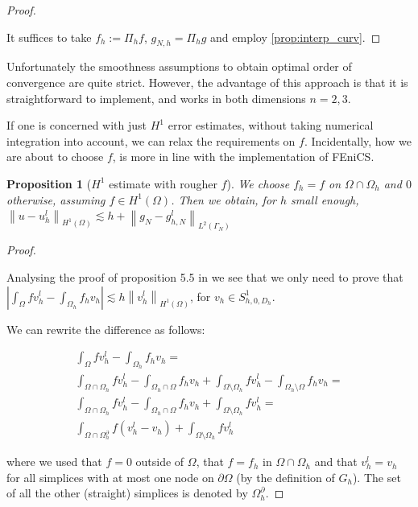 \documentclass[english,a4paper,9pt,oneside]{scrbook}	%
\theoremstyle{break}
\newtheorem{prop}[equation]{Proposition}
\newenvironment{mproof}[1][\proofname]{%
  \begin{proof}[#1]$ $\par\nobreak\ignorespaces
}{%
  \end{proof}
}
\renewcommand*{\proofname}{Proof}
\theoremstyle{remark}
\newcommand{\ds}{\displaystyle}
\newcommand{\norm}[1]{\left\lVert#1\right\rVert}
\begin{document}
\begin{appendices}
\begin{mproof}
It suffices to take $f_h:=\Pi_h f$, $g_{N,h} = \Pi_h g$ and employ \cref{prop:interp_curv}.
\end{mproof}

Unfortunately the smoothness assumptions to obtain optimal order of convergence are quite strict. However, the advantage of this approach is that it is straightforward to implement, and works in both dimensions $n=2,3$.

If one is concerned with just $H^1$ error estimates, without taking numerical integration into account, we can relax the requirements on $f$. Incidentally, how we are about to choose $f$, is more in line with the implementation of FEniCS.

\begin{prop}[$H^1$ estimate with rougher $f$]
We choose $f_h=f $ on $\Omega \cap \Omega_h$ and $0$ otherwise, assuming $f \in H^1(\Omega)$. Then we obtain, for $h$ small enough, $\norm{u-u_h^l}_{H^1(\Omega)} \lesssim h + \norm{g_N-g_{h,N}^l}_{L^2(\Gamma_N)}$
\end{prop}
\begin{mproof}

Analysing the proof of proposition 5.5 in \cite{edelmann} we see that we only need to prove that $\ds \left | \int_\Omega f v_h^l - \int_{\Omega_h}f_h v_h \right |\lesssim h \norm{v_h^l}_{H^1(\Omega)} $, for $v_h \in S^1_{h,0,D_h}$.

We can rewrite the difference as follows:

\begin{align*}
\int_\Omega f v_h^l - \int_{\Omega_h}f_h v_h   =\\
\int_{\Omega \cap \Omega_h} f v_h^l - \int_{\Omega_h \cap \Omega} f_h v_h  + \int_{\Omega \setminus \Omega_h} f v_h^l - \int_{\Omega_h \setminus \Omega} f_h v_h  =\\
\int_{\Omega \cap \Omega_h} f v_h^l - \int_{\Omega_h \cap \Omega} f_h v_h  + \int_{\Omega \setminus \Omega_h} f v_h^l = \\
\int_{\Omega \cap \Omega_h^\partial} f (v_h^l - v_h)  + \int_{\Omega \setminus \Omega_h} f v_h^l
\end{align*}

where we used that $f=0$ outside of $\Omega$, that $f=f_h$ in $\Omega \cap \Omega_h$ and that $v_h^l=v_h$ for all simplices with at most one node on $\partial \Omega$ (by the definition of $G_h$). The set of all the other (straight) simplices is denoted by $\Omega_h^\partial$.


\end{mproof}
\end{appendices}
\end{document}
